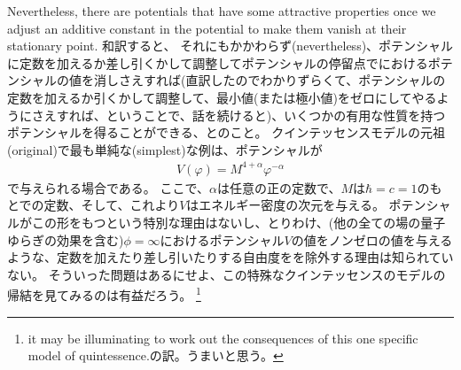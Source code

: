 \documentclass[11pt]{ltjsarticle}
\theoremstyle{plain}
\theoremstyle{break}
\begin{document}
Nevertheless, there are potentials that have some attractive properties once we adjust an additive constant in the potential to make them vanish at their stationary point.
和訳すると、
それにもかかわらず(nevertheless)、ポテンシャルに定数を加えるか差し引くかして調整してポテンシャルの停留点でにおけるポテンシャルの値を消しさえすれば(直訳したのでわかりずらくて、ポテンシャルの定数を加えるか引くかして調整して、最小値(または極小値)をゼロにしてやるようにさえすれば、ということで、話を続けると)、いくつかの有用な性質を持つポテンシャルを得ることができる、とのこと。
クインテッセンスモデルの元祖(original)で最も単純な(simplest)な例は、ポテンシャルが
\begin{align}
  V(\varphi)=M^{4+\alpha} \varphi^{-\alpha} \label{eq:1.12.5}
\end{align}%
で与えられる場合である。
ここで、$\alpha$は任意の正の定数で、$M$は$\hbar = c = 1$のもとでの定数、そして、これより$V$はエネルギー密度の次元を与える。
ポテンシャルがこの形をもつという特別な理由はないし、とりわけ、(他の全ての場の量子ゆらぎの効果を含む)$\phi = \infty$におけるポテンシャル$V$の値をノンゼロの値を与えるような、定数を加えたり差し引いたりする自由度をを除外する理由は知られていない。
そういった問題はあるにせよ、この特殊なクインテッセンスのモデルの帰結を見てみるのは有益だろう。
\footnote{ it may be illuminating to work out the consequences of this one specific model of quintessence.の訳。うまいと思う。}
\end{document}
